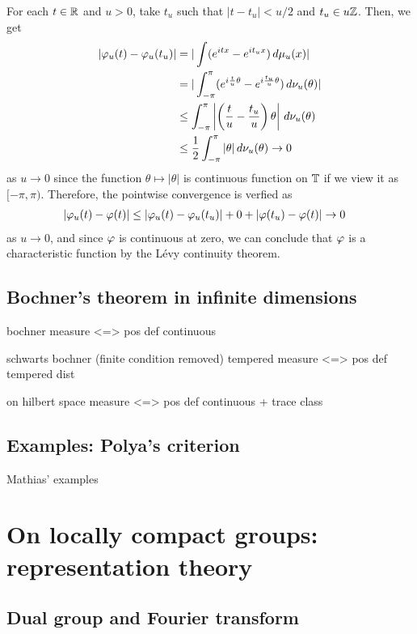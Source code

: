 \documentclass[12pt]{article}
\begin{document}
\begin{pf}
For each $t\in\mathbb{R}$ and $u>0$, take $t_u$ such that $|t-t_u|<u/2$ and $t_u\in u\mathbb{Z}$.
Then, we get
\begin{align*}
|\varphi_u(t)-\varphi_u(t_u)|
&=|\int(e^{itx}-e^{it_ux})\,d\mu_u(x)|\\
&=|\int_{-\pi}^\pi(e^{i\frac tu\theta}-e^{i\frac{t_u}u\theta})\,d\nu_u(\theta)|\\
&\le\int_{-\pi}^\pi\left|\left(\frac tu-\frac{t_u}u\right)\theta\right|\,d\nu_u(\theta)\\
&\le\frac12\int_{-\pi}^\pi|\theta|\,d\nu_u(\theta)\to0
\end{align*}
as $u\to0$ since the function $\theta\mapsto|\theta|$ is continuous function on $\mathbb{T}$ if we view it as $[-\pi,\pi)$.
Therefore, the pointwise convergence is verfied as
\begin{align*}
|\varphi_u(t)-\varphi(t)|&\le|\varphi_u(t)-\varphi_u(t_u)|+0+|\varphi(t_u)-\varphi(t)|\to0
\end{align*}
as $u\to0$, and since $\varphi$ is continuous at zero, we can conclude that $\varphi$ is a characteristic function by the L\'evy continuity theorem.
\end{pf}


\subsection{Bochner's theorem in infinite dimensions}

bochner
measure <=> pos def continuous

schwarts bochner (finite condition removed)
tempered measure <=> pos def tempered dist


on hilbert space
measure <=> pos def continuous + trace class



\subsection{Examples: Polya's criterion}
Mathias' examples







\section{On locally compact groups: representation theory}

\subsection{Dual group and Fourier transform}
\end{document}
